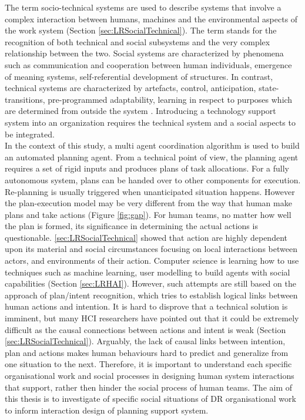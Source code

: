 The term socio-technical systems are used to describe systems that involve a complex interaction between humans, machines and the environmental aspects of the work system (Section \ref{sec:LRSocialTechnical}). The term stands for the recognition of both technical and social subsystems and the very complex relationship between the two. Social systems are characterized by phenomena such as communication and cooperation between human individuals, emergence of meaning systems, self-referential development of structures. In contrast, technical systems are characterized by artefacts, control, anticipation, state-transitions, pre-programmed adaptability, learning in respect to purposes which are determined from outside the system \cite{Ropohl1999}. Introducing a technology support system into an organization requires the technical system and a social aspects to be integrated.\\

In the context of this study, a multi agent coordination algorithm is used to build an automated planning agent. From a technical point of view,  the planning agent requires a set of rigid inputs and produces plans of task allocations. For a fully autonomous system, plans can be handed over to other components for execution. Re-planning is usually triggered when unanticipated situation happens. However the plan-execution model may be very different from the way that human make plans and take actions (Figure \ref{fig:gap}). For human teams, no matter how well the plan is formed, its significance in determining the actual actions is questionable. \ref{sec:LRSocialTechnical} showed that action are highly dependent upon its material and social circumstances focusing on local interactions between actors, and environments of their action. Computer science is learning how to use techniques such as machine learning, user modelling to build agents with social capabilities (Section \ref{sec:LRHAI}). However, such attempts are still based on the approach of plan/intent recognition, which tries to establish logical links between human actions and intention.  It is hard to disprove that a technical solution is imminent, but many \ac{HCI} researchers have pointed out that it could be extremely difficult as the causal connections between actions and intent is weak (Section \ref{sec:LRSocialTechnical}). Arguably, the lack of causal links between intention, plan and actions makes human behaviours hard to predict and generalize from one situation to the next. Therefore, it is important to understand each specific organisational work and social processes in designing human system interactions that support, rather then hinder the social process of human teams. The aim of this thesis is to investigate of specific social situations of \ac{DR} organisational work to inform interaction design of planning support system. \\

